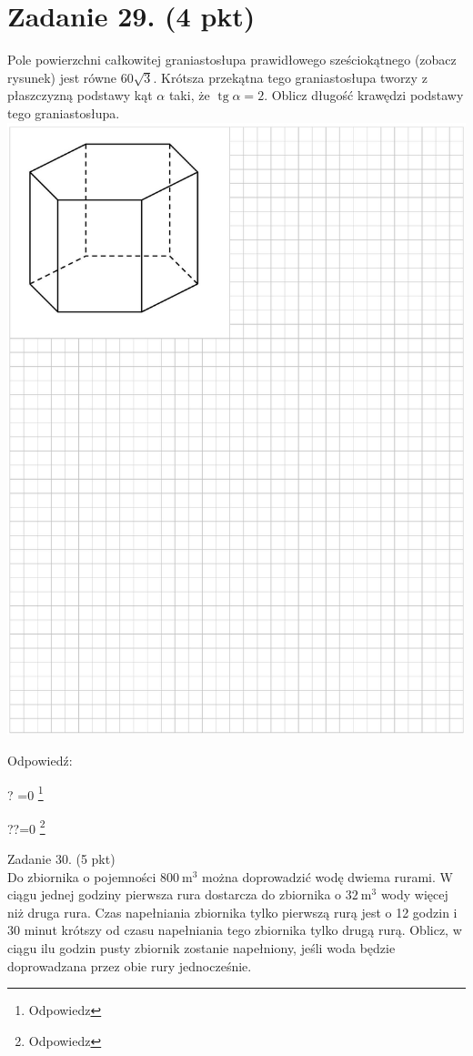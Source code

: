 \documentclass[10pt]{article}
\let\svthefootnote\thefootnote
\newcommand\blfootnotetext[1]{%
  \let\thefootnote\relax\footnote{#1}%
  \addtocounter{footnote}{-1}%
  \let\thefootnote\svthefootnote%
}
\let\svfootnotetext\footnotetext
\renewcommand\footnotetext[2][?]{%
  \if\relax#1\relax%
    \ifnum\value{footnote}=0\blfootnotetext{#2}\else\svfootnotetext{#2}\fi%
  \else%
    \if?#1\ifnum\value{footnote}=0\blfootnotetext{#2}\else\svfootnotetext{#2}\fi%
    \else\svfootnotetext[#1]{#2}\fi%
  \fi
}
\begin{document}
\section*{Zadanie 29. (4 pkt)}
Pole powierzchni całkowitej graniastosłupa prawidłowego sześciokątnego (zobacz rysunek) jest równe \(60 \sqrt{3}\). Krótsza przekątna tego graniastosłupa tworzy z płaszczyzną podstawy kąt \(\alpha\) taki, że \(\operatorname{tg} \alpha=2\). Oblicz długość krawędzi podstawy tego graniastosłupa.\\
\includegraphics[max width=\textwidth, center]{2024_11_21_6438f6dbc3784fe6d1deg-13}

Odpowiedź: \(\qquad\)

Zadanie 30. (5 pkt)\\
Do zbiornika o pojemności \(800 \mathrm{~m}^{3}\) można doprowadzić wodę dwiema rurami. W ciągu jednej godziny pierwsza rura dostarcza do zbiornika o \(32 \mathrm{~m}^{3}\) wody więcej niż druga rura. Czas napełniania zbiornika tylko pierwszą rurą jest o 12 godzin i 30 minut krótszy od czasu napełniania tego zbiornika tylko drugą rurą. Oblicz, w ciągu ilu godzin pusty zbiornik zostanie napełniony, jeśli woda będzie doprowadzana przez obie rury jednocześnie.
\end{document}
